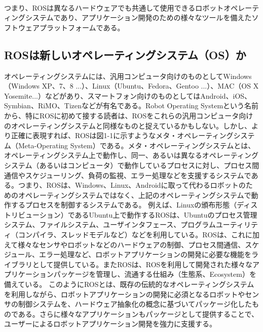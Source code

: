 \noindent{}\\

つまり、ROSは異なるハードウェアでも共通して使用できるロボットオペレーティングシステムであり、アプリケーション開発のための様々なツールを備えたソフトウェアプラットフォームである。

\subsection{ROSは新しいオペレーティングシステム（OS）か}

オペレーティングシステムには、汎用コンピュータ向けのものとしてWindows（Windows XP、7、8 ...）、Linux（Ubuntu、Fedora、Gentoo ...）、MAC（OS X Yosemite...）などがあり、スマートフォン向けのものとしてはAndroid、iOS、Symbian、RiMO、Tizenなどが有名である。Robot Operating Systemという名前から、特にROSに初めて接する読者は、ROSをこれらの汎用コンピュータ向けのオペレーティングシステムと同様なものと捉えているかもしない。しかし、より正確に表現すれば、ROSは図1-1に示すようなメタ・オペレーティングシステム（Meta-Operating System）である。メタ・オペレーティングシステムとは、オペレーティングシステム上で動作し、同一、あるいは異なるオペレーティングシステム（あるいはコンピュータ）で動作しているプロセスに対し、プロセス間通信やスケジューリング、負荷の監視、エラー処理などを支援するシステムである。つまり、ROSは、Windows、Linux、Androidに取って代わるロボットのためのオペレーティングシステムではなく、上記のオペレーティングシステムで動作するプロセスを制御するシステムである。
例えば、Linuxの頒布形態（ディストリビューション）であるUbuntu上で動作するROSは、Ubuntuのプロセス管理システム、ファイルシステム、ユーザインタフェース、プログラムユーティリティ（コンパイラ、スレッドモデルなど）などを利用している。ROSは、これに加えて様々なセンサやロボットなどのハードウェアの制御、プロセス間通信、スケジュール、エラー処理など、ロボットアプリケーションの開発に必要な機能をライブラリとして提供している。またROSは、ROSを利用して開発された様々なアプリケーションパッケージを管理し、流通する仕組み（生態系、Ecosystem）を備えている。
このようにROSとは、既存の伝統的なオペレーティングシステムを利用しながら、ロボットアプリケーションの開発に必須となるロボットやセンサの制御システムを、ハードウェア抽象化の概念に基づいてパッケージ化したものである。さらに様々なアプリケーションもパッケージとして提供することで、ユーザーによるロボットアプリケーション開発を強力に支援する。


